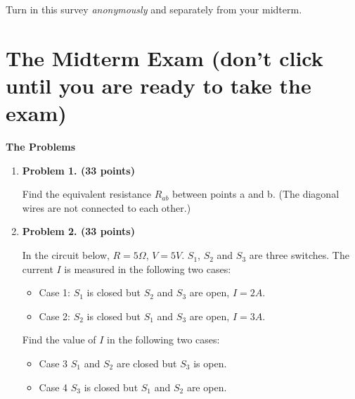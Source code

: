 Turn in this survey {\em anonymously} and separately from your midterm.


\section*{The Midterm Exam (don't click until you are ready to take the exam)}

{\bf The Problems}
\begin{enumerate}


\item {\bf Problem 1. (33 points)} 

  Find the equivalent resistance $R_{ab}$ between points a and b. (The diagonal
  wires are not connected to each other.)


  \begin{comment}
  {\bf Solution}

  The circuit can be converted into two parallel branches between a and b
  each composed of two resistors with 20 $\Omega$ and 60 $\Omega$ in series,
  and two parallel branches between the two middle points each composed of 
  two 20 $\Omega$ resistors in series and two 60 $\Omega$ resistors in
  series, respectively. This is a balanced bridge with no current through
  the middle branches, i.e., $R_{ab}=40\Omega$
  \end{comment}

\item {\bf Problem 2. (33 points)} 

  In the circuit below, $R=5\Omega$, $V=5V$. $S_1$, $S_2$ and $S_3$
  are three switches. The current $I$ is measured in the following
  two cases:
  \begin{itemize}
  \item Case 1: $S_1$ is closed but $S_2$ and $S_3$ are open, $I=2A$.
  \item Case 2: $S_2$ is closed but $S_1$ and $S_3$ are open, $I=3A$.
  \end{itemize}
  Find the value of $I$ in the following two cases:
  \begin{itemize}
  \item Case 3 $S_1$ and $S_2$ are closed but $S_3$ is open.
  \item Case 4 $S_3$ is closed but $S_1$ and $S_2$ are open.
  \end{itemize}


  \begin{comment}
  {\bf Solution:} Assume the circuit in the box is modeled by
  $R_T$ and $V_T$. 
  \begin{itemize}
  \item Case 1: $V_T/(R_T+5)=2$
  \item Case 2: $(V_T-V)/R_T=3$
  \end{itemize}
  Solving these two equations we get $V_T=20V$, $R_T=5\Omega$
  \begin{itemize}
  \item Case 3: $I=3A$
  \item Case 4: $I=1.5A$
  \end{itemize}
  \end{comment}



\end{enumerate}
